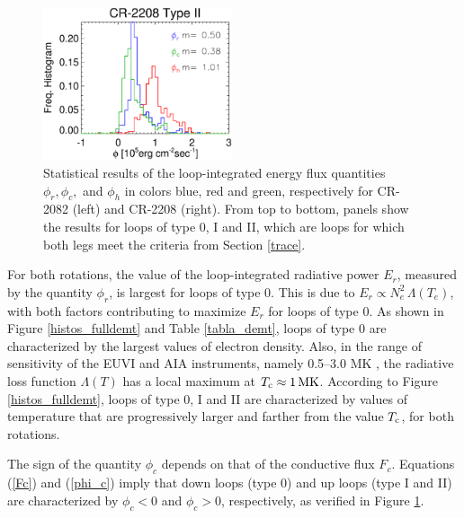 \documentclass[namedreferences]{solarphysics}
\newcommand{\MK}{{\rm MK}}
\newcommand{\Tc}{T_{\rm c}}
\begin{document}
\begin{article}
\begin{figure}[ht]
\begin{center}
\includegraphics[width=0.495\textwidth]{figs/histocr2208_cgenergia.eps}
\caption{{Statistical results of the loop-integrated energy flux quantities $\phi_r,\phi_c,$ and $\phi_h$ in colors blue, red and green, respectively for CR-2082 (left) and CR-2208 (right). From top to bottom, panels show the results for loops of type 0, I and II, which are loops for which both legs meet the criteria from Section \ref{trace}.}}
\label{energia_demt}
\end{center}
\end{figure} 

{For both rotations, the value of the {loop-integrated} radiative power $E_r$, measured by the quantity $\phi_r$, is largest for loops of type 0. This is due to $E_r\propto N_e^2\,\Lambda(T_e)$, with both factors contributing to maximize $E_r$ for loops of type 0. As shown in Figure \ref{histos_fulldemt} and Table \ref{tabla_demt}, loops of type 0 are characterized by {the largest} values of electron density. Also, in the range of sensitivity of the EUVI and AIA instruments, namely 0.5–3.0 MK \citep{nuevo_2015}, the radiative loss function $\Lambda(T)$ has a local maximum at $\Tc\approx 1\,\MK$. According to Figure \ref{histos_fulldemt}, loops of type 0, I and II are characterized by {values of temperature that are progressively larger and farther} from the value $\Tc$, for both rotations.}

{{The sign of the quantity $\phi_c$ depends on that of the conductive flux $F_c$. Equations (\ref{Fc}) and (\ref{phi_c}) imply that } down loops (type 0) and up loops (type I and II) are characterized by $\phi_c<0$ and $\phi_c>0$, respectively, {as verified} in Figure \ref{energia_demt}.}


\end{article}
\end{document}
